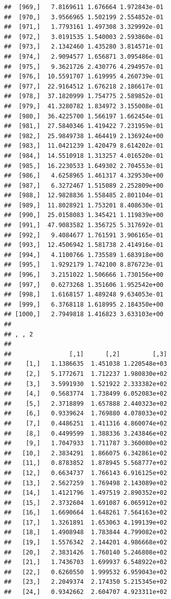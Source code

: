 \documentclass[article]{jss}\usepackage[]{graphicx}\usepackage[]{xcolor}
\makeatletter
\newenvironment{kframe}{%
 \def\at@end@of@kframe{}%
 \ifinner\ifhmode%
  \def\at@end@of@kframe{\end{minipage}}%
  \begin{minipage}{\columnwidth}%
 \fi\fi%
 \def\FrameCommand##1{\hskip\@totalleftmargin \hskip-\fboxsep
 \colorbox{shadecolor}{##1}\hskip-\fboxsep
     \hskip-\linewidth \hskip-\@totalleftmargin \hskip\columnwidth}%
 \MakeFramed {\advance\hsize-\width
   \@totalleftmargin\z@ \linewidth\hsize
   \@setminipage}}%
 {\par\unskip\endMakeFramed%
 \at@end@of@kframe}
\newenvironment{knitrout}{}{} %
\makeatother
\begin{document}
\begin{knitrout}
\begin{kframe}
\begin{verbatim}
##  [969,]   7.8169611 1.676664 1.972843e-01
##  [970,]   3.9566965 1.502199 2.554852e-01
##  [971,]   1.7793161 1.497308 3.329992e-01
##  [972,]   3.0191535 1.540003 2.593860e-01
##  [973,]   2.1342460 1.435280 3.814571e-01
##  [974,]   2.9094577 1.656871 3.095486e-01
##  [975,]   9.3621726 2.430776 4.294957e-01
##  [976,]  10.5591707 1.619995 4.260739e-01
##  [977,]  22.9164512 1.676218 2.186617e-01
##  [978,]  37.1820999 1.754775 2.589852e-01
##  [979,]  41.3280782 1.834972 3.155008e-01
##  [980,]  36.4225700 1.566197 1.662454e-01
##  [981,]  27.5840346 1.419422 7.231959e-01
##  [982,]  25.9849738 1.464419 2.136924e+00
##  [983,]  11.0421239 1.420479 8.614202e-01
##  [984,]  14.5510918 1.313257 4.016520e-01
##  [985,]  16.2230533 1.649302 2.704553e-01
##  [986,]   4.6258965 1.461317 4.329530e+00
##  [987,]   6.3272467 1.515089 2.252809e+00
##  [988,]  12.9828836 1.558485 2.801104e-01
##  [989,]  11.8028921 1.753201 8.408630e-01
##  [990,]  25.0158083 1.345421 1.119839e+00
##  [991,]  47.9083582 1.356725 5.317692e-01
##  [992,]   9.4084677 1.761591 3.906165e-01
##  [993,]  12.4506942 1.581738 2.414916e-01
##  [994,]   4.1100766 1.735589 1.683918e+00
##  [995,]   1.9292179 1.742100 8.876723e-01
##  [996,]   3.2151022 1.506666 1.730156e+00
##  [997,]   0.6273268 1.351606 1.952542e+00
##  [998,]   1.6168157 1.489248 9.634053e-01
##  [999,]   6.3768118 1.618995 2.184350e+00
## [1000,]   2.7949818 1.416823 3.633103e+00
## 
## , , 2
## 
##                [,1]      [,2]         [,3]
##    [1,]   1.1386635  1.451038 1.220548e+03
##    [2,]   5.1772671  1.712237 1.980830e+02
##    [3,]   3.5991930  1.521922 2.333382e+02
##    [4,]   0.5683774  1.738499 6.052083e+02
##    [5,]   2.3718899  1.657888 2.440323e+02
##    [6,]   0.9339624  1.769880 4.078033e+02
##    [7,]   0.4486251  1.411316 4.860074e+02
##    [8,]   0.4499599  1.388336 3.243846e+02
##    [9,]   1.7047933  1.711787 3.360080e+02
##   [10,]   2.3834291  1.866075 6.342861e+02
##   [11,]   0.8783852  1.878945 5.568777e+02
##   [12,]   0.6634737  1.766143 6.916125e+02
##   [13,]   2.5627259  1.769498 2.143089e+02
##   [14,]   1.4121796  1.497519 2.890352e+02
##   [15,]   2.3732604  1.691087 6.065912e+02
##   [16,]   1.6690664  1.648261 7.564163e+02
##   [17,]   1.3261891  1.653063 4.199139e+02
##   [18,]   1.4908948  1.783844 4.799082e+02
##   [19,]   1.5576342  2.144201 4.986668e+02
##   [20,]   2.3831426  1.760140 5.246808e+02
##   [21,]   1.7436703  1.699937 6.548922e+02
##   [22,]   0.6260550  1.999532 6.959043e+02
##   [23,]   2.2049374  2.174350 5.215345e+02
##   [24,]   0.9342662  2.604707 4.923311e+02

\end{verbatim}
\end{kframe}
\end{knitrout}
\end{document}
